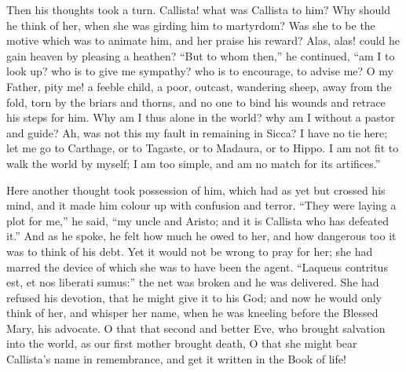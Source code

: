 Then his thoughts took a turn. Callista! what was Callista to him?
Why should he think of her, when she was girding him to martyrdom? Was
she to be the motive which was to animate him, and her praise his
reward? Alas, alas! could he gain heaven by pleasing a heathen?
``But to whom then,'' he continued, ``am I to look up? who
is to give me sympathy? who is to encourage, to advise me? O my
Father, pity me! a feeble child, a poor, outcast, wandering sheep,
away from the fold, torn by the briars and thorns, and no one to bind
his wounds and retrace his steps for him. Why am I thus alone in the
world? why am I without a pastor and guide? Ah, was not this my fault
in remaining in Sicca? I have no tie here; let me go to Carthage, or
to Tagaste, or to Madaura, or to Hippo. I am not fit to walk the world
by myself; I am too simple, and am no match for its artifices.''

Here another thought took possession of him, which had as yet but
crossed his mind, and it made him colour up with confusion and terror.
``They were laying a plot for me,'' he said, ``my uncle
and Aristo; and it is Callista who has defeated it.'' And as he
spoke, he felt how much he owed to her, and how dangerous too it was
to think of his debt. Yet it would not be wrong to pray for her; she
had marred the device of which she was to have been the agent. ``Laqueus
contritus est, et nos liberati sumus:'' the net was broken and he
was delivered. She had refused his devotion, that he might give it to
his God; and now he would only think of her, and whisper her name,
when he was kneeling before the Blessed Mary, his advocate. O that
that second and better Eve, who brought salvation into the world, as
our first mother brought death, O that she might bear Callista's
name in remembrance, and get it written in the Book of life!


